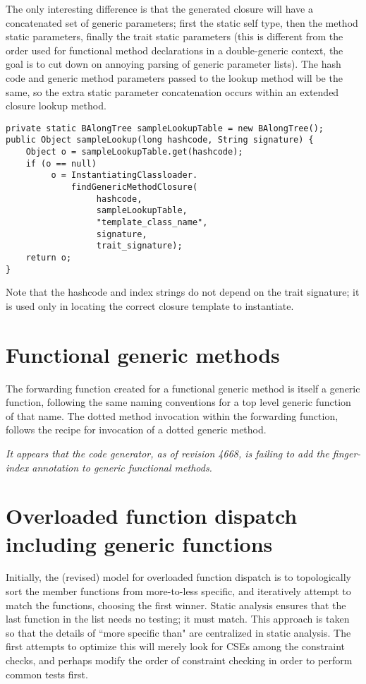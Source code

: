 \documentclass[11pt]{article}
\begin{document}
The only interesting difference is that the generated closure will have a concatenated set of generic parameters; first the static self type, then the method static parameters, finally the trait static parameters (this is different from the order used for functional method declarations in a double-generic context, the goal is to cut down on annoying parsing of generic parameter lists).  The hash code and generic method parameters passed to the lookup method will be the same, so the extra static parameter concatenation occurs within an extended closure lookup method.

\begin{verbatim}
private static BAlongTree sampleLookupTable = new BAlongTree();
public Object sampleLookup(long hashcode, String signature) {
    Object o = sampleLookupTable.get(hashcode);
    if (o == null) 
         o = InstantiatingClassloader.
             findGenericMethodClosure(
                  hashcode,
                  sampleLookupTable,
                  "template_class_name",
                  signature,
                  trait_signature);
    return o;
}
\end{verbatim}

Note that the hashcode and index strings do not depend on the trait signature; it is used only in locating the correct closure template to instantiate.

\section{Functional generic methods}

The forwarding function created for a functional generic method is itself a generic function, following the same naming conventions for a top level generic function of that name.  The dotted method invocation within the forwarding function, follows the recipe for invocation of a dotted generic method.

{\it It appears that the code generator, as of revision 4668, is failing to add the finger-index annotation to generic functional methods.}

\section{Overloaded function dispatch including generic functions}

Initially, the (revised) model for overloaded function dispatch is to topologically sort the member functions from more-to-less specific, and iteratively attempt to match the functions, choosing the first winner.  Static analysis ensures that the last function in the list needs no testing; it must match.  This approach is taken so that the details of ``more specific than" are centralized in static analysis.  The first attempts to optimize this will merely look for CSEs among the constraint checks, and perhaps modify the order of constraint checking in order to perform common tests first.
\end{document}
